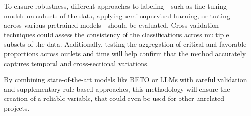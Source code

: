 To ensure robustness, different approaches to labeling—such as fine-tuning models on subsets of the data, applying semi-supervised learning, or testing across various pretrained models—should be evaluated. Cross-validation techniques could assess the consistency of the classifications across multiple subsets of the data. Additionally, testing the aggregation of critical and favorable proportions across outlets and time will help confirm that the method accurately captures temporal and cross-sectional variations.

By combining state-of-the-art models like BETO or LLMs with careful validation and supplementary rule-based approaches, this methodology will ensure the creation of a reliable variable, that could even be used for other unrelated projects.


